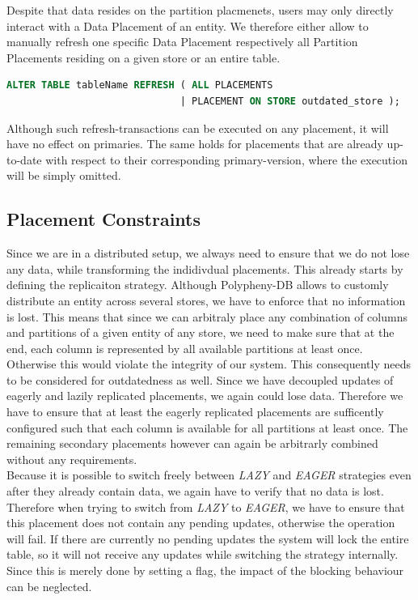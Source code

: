 Despite that data resides on the partition placmenets, users may only directly interact with a Data Placement of an entity.
We therefore either allow to manually refresh one specific Data Placement respectively all Partition Placements residing on a given store or an entire table.

\begin{lstlisting}[language=sql, caption={SQL Statement Syntax for an On-Demand Refresh Operation},label={lst:refresh}]
ALTER TABLE tableName REFRESH ( ALL PLACEMENTS 
                              | PLACEMENT ON STORE outdated_store );
\end{lstlisting}

Although such refresh-transactions can be executed on any placement, it will have no effect on primaries. 
The same holds for placements that are already up-to-date with respect to their corresponding primary-version, where the execution will be simply omitted.





\subsection{Placement Constraints}
\label{sec:constraints}

Since we are in a distributed setup, we always need to ensure that we do not lose any data, while transforming the indidivdual placements. 
This already starts by defining the replicaiton strategy. Although Polypheny-DB allows to customly distribute an entity across several stores, we have to enforce that no 
information is lost. This means that since we can arbitraly place any combination of columns and partitions of a given entity of any store, we need to make sure that at the end, 
each column is represented by all available partitions at least once. Otherwise this would violate the integrity of our system. 
This consequently needs to be considered for outdatedness as well. Since we have decoupled updates of eagerly and lazily replicated placements, we again could lose data. 
Therefore we have to ensure that at least the eagerly replicated placements are sufficently configured such that each column is available for all partitions at least once.
The remaining secondary placements however can again be arbitrarly combined without any requirements.\\
Because it is possible to switch freely between \emph{LAZY} and \emph{EAGER} strategies even after they already contain data, we again have to verify that no data is lost.
Therefore when trying to switch from \emph{LAZY} to \emph{EAGER}, we have to ensure that this placement does not contain any pending updates, otherwise the operation will fail.
If there are currently no pending updates the system will lock the entire table, so it will not receive any updates while switching the strategy internally. 
Since this is merely done by setting a flag, the impact of the blocking behaviour can be neglected.

